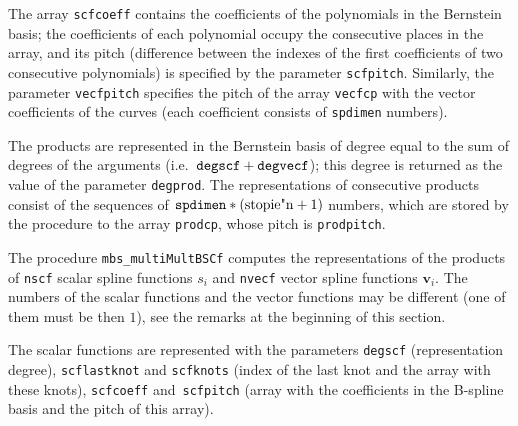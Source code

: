 The array \texttt{scfcoeff} contains the coefficients of the polynomials
in the Bernstein basis; the coefficients of each polynomial occupy
the consecutive places in the array, and its pitch (difference
between the indexes of the first coefficients of two consecutive
polynomials) is specified by the parameter \texttt{scfpitch}.
Similarly, the parameter \texttt{vecfpitch} specifies the pitch
of the array \texttt{vecfcp} with the vector coefficients of the curves
(each coefficient consists of \texttt{spdimen} numbers).

The products are represented in the Bernstein basis of degree equal to
the sum of degrees of the arguments (i.e.\
$\mathord{\mbox{\texttt{degscf}}}+\mathord{\mbox{\texttt{degvecf}}}$);
this degree is returned as the value of the parameter \texttt{degprod}.
The representations of consecutive products consist of the sequences of
$\mathord{\mbox{\texttt{spdimen}}}*(\mathord{\mbox{stopie"n}}+1)$ numbers,
which are stored by the procedure to the array \texttt{prodcp}, whose pitch is
\texttt{prodpitch}.

\vspace{\bigskipamount}
The procedure \texttt{mbs\_multiMultBSCf} computes the representations of
the products of \texttt{nscf} scalar spline functions $s_i$ and \texttt{nvecf}
vector spline functions $\bm{v}_i$. The numbers of the scalar functions and the
vector functions may be different (one of them must be then $1$),
see the remarks at the beginning of this section.

The scalar functions are represented with the parameters \texttt{degscf}
(representation degree), \texttt{scflastknot} and \texttt{scfknots} (index
of the last knot and the array with these knots), \texttt{scfcoeff}
and~\texttt{scfpitch} (array with the coefficients in the B-spline basis
and the pitch of this array).

